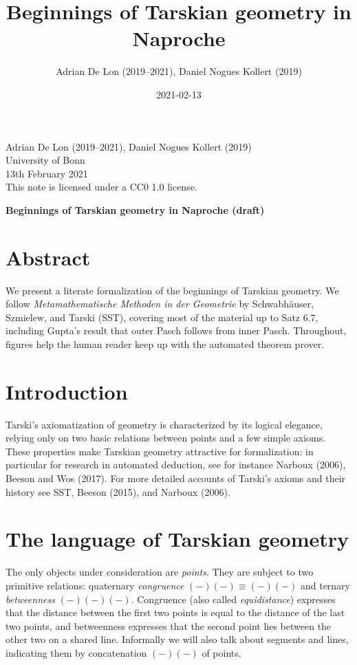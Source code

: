 \documentclass[10pt,a4paper,parskip=half,numbers=endperiod,parskip]{scrartcl}
\title{Beginnings of Tarskian geometry in Naproche}
\author{Adrian De Lon (2019--2021), Daniel Nogues Kollert (2019)}
\date{2021-02-13}
\makeatletter
\renewenvironment{abstract}{%
  \if@titlepage
    \titlepage
    \null\vfil
    \@beginparpenalty\@lowpenalty
    \if@abstrt
      \begin{center}
        \normalfont\sectfont\nobreak\abstractname
        \@endparpenalty\@M
      \end{center}
    \fi
  \else
    \section*{Abstract}
    \if@twocolumn\if@abstrt
        \addsec*{\abstractname}
      \fi
    \else
      \if@abstrt
        \small
        \begin{flushleft}
          {\normalfont\sectfont\nobreak\abstractname
            \vspace{-.5em}\vspace{\z@}}%
        \end{flushleft}
      \fi
    \fi
  \fi
}{%
  \if@titlepage
    \par\vfil\null\endtitlepage
  \else
    \if@twocolumn\else
            \par
    \fi
  \fi
}
\theoremstyle{formalized}
\newcommand{\Betw}[3]{#1 #2 #3}
\makeatother
\begin{document}
  \begin{flushleft}
    Adrian De Lon (2019--2021), Daniel Nogues Kollert (2019)
    \\ University of Bonn
    \\ 13th February 2021
    \\ This note is licensed under a {CC0 1.0} license.
  \end{flushleft}

  \vspace*{2\baselineskip}

  {\large\bfseries\sffamily Beginnings of Tarskian geometry in Naproche (draft)}


  \begin{abstract}
    We present a %
    literate formalization of the beginnings of Tarskian geometry.
    We follow
    \textit{Metamathematische Methoden in der Geometrie}
    by Schwabhäuser, Szmielew, and Tarski ({SST}),
    covering most of the material up to Satz 6.7\kern-1pt,
including Gupta's result that outer Pasch follows from inner Pasch.
    Throughout, figures help the human reader keep up with the automated theorem prover.
  \end{abstract}

  \section{Introduction}

  Tarski's axiomatization of geometry is characterized by its logical elegance, relying only on two basic relations between points
  and a few simple axioms.
  These properties make Tarskian geometry attractive for formalization:
  in particular for research in automated deduction, see for instance Narboux (2006), Beeson and Wos (2017).
  For more detailed accounts of Tarski's axioms and their history see
  {SST}, Beeson (2015), and Narboux (2006).

  \section{The language of Tarskian geometry}

  The only objects under consideration are \textit{points}.
  They are subject to two primitive relations:
  quaternary \textit{congruence} ${(-)}{(-)}{\equiv}{(-)}{(-)}$
  and ternary \textit{betweenness} $\Betw{(-)}{(-)}{(-)}$.
  Congruence (also called \textit{equidistance}) expresses that the distance between the first two points is equal to the distance of the last two points, and betweenness expresses that
  the second point lies between the other two on a shared line.
  Informally we will also talk about segments and lines,
  indicating them by concatenation $(-)(-)$ of points.
\end{document}
